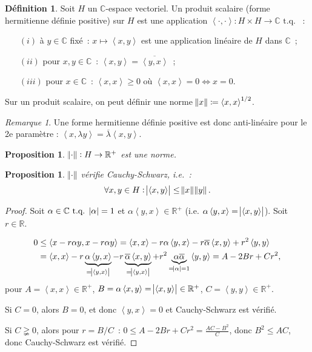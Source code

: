 \documentclass{report}
\newcommand{\C}{{\mathbb C}}
\newcommand{\R}{{\mathbb R}}
\newcommand{\scpr}[2]{\left\langle#1, #2\right\rangle}
\newcommand{\tq}{\text{ t.q. }}
\newtheorem{prp}[thm]{Proposition}
\theoremstyle{definition}
\newtheorem{déf}[thm]{Définition}
\theoremstyle{remark}
\newtheorem*{rmq}{Remarque}
\begin{document}
\begin{déf} Soit $H$ un $\C$-espace vectoriel. Un produit scalaire (forme hermitienne définie positive) sur $H$ est une application $\scpr \cdot\cdot : H \times H \to \C \tq$~:
\begin{itemize}
	\item[$(i)$]   à $y \in \C$ fixé~: $x \mapsto \scpr xy$ est une application linéaire de $H$ dans $\C$~;
	\item[$(ii)$]  pour $x, y \in \C$~: $\scpr xy = \overline {\scpr yx}$~;
	\item[$(iii)$] pour $x \in \C$~: $\scpr xx \geq 0$ où $\scpr xx = 0 \iff x = 0$.
\end{itemize}

Sur un produit scalaire, on peut définir une norme $\norm x \coloneqq \scpr xx^{1/2}$.
\end{déf}

\begin{rmq} Une forme hermitienne définie positive est donc anti-linéaire pour le 2e paramètre : $\scpr x{\lambda y} = \overline \lambda \scpr xy$.
\end{rmq}

\begin{prp} $\norm \cdot : H \to \R^+$ est une norme.
\end{prp}

\begin{prp} $\norm \cdot$ vérifie Cauchy-Schwarz, i.e.~:
\[\forall x, y \in H : \abs {\scpr xy} \leq \norm x\norm y.\]
\end{prp}

\begin{proof} Soit $\alpha \in \C \tq \abs \alpha = 1$ et $\alpha\scpr yx \in \R^+$ (i.e. $\alpha\scpr yx = \abs {\scpr xy}$). Soit $r \in \R$.

\begin{align*}
	0 &\leq \scpr {x-r\alpha y}{x-r\alpha y} = \scpr xx - r\alpha\scpr yx - r\overline \alpha\scpr xy + r^2\scpr yy \\
		&= \scpr xx - r\underbrace {\alpha \scpr yx}_{= \abs {\scpr yx}} - r\underbrace {\overline \alpha \scpr xy}_{= \abs {\scpr yx}} + r^2\underbrace {\alpha\overline\alpha}_{= \abs \alpha = 1} \scpr yy = A - 2Br + Cr^2,
\end{align*}
pour $A = \scpr xx \in \R^+$, $B = \alpha\scpr xy = \abs {\scpr xy} \in \R^+$, $C = \scpr yy \in \R^+$.

Si $C = 0$, alors $B = 0$, et donc $\scpr yx = 0$ et Cauchy-Schwarz est vérifié.

Si $C \gneqq 0$, alors pour $r = B/C$~: $0 \leq A - 2Br + Cr^2 = \frac {AC-B^2}C$, donc $B^2 \leq AC$, donc Cauchy-Schwarz est vérifié.
\end{proof}
\end{document}
